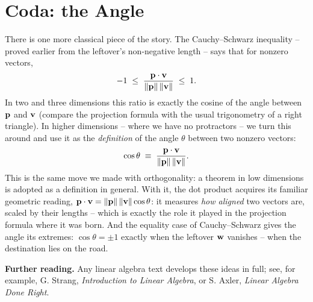 \documentclass[12pt]{article}
\begin{document}
\section{Coda: the Angle}
There is one more classical piece of the story.  The Cauchy--Schwarz
inequality -- proved earlier from the leftover's non-negative length --
says that for nonzero vectors,
$$ -1 \; \le \; \frac{{\bf p} \cdot {\bf v}}{\|{\bf p}\| \, \|{\bf v}\|}
\; \le \; 1. $$
In two and three dimensions this ratio is exactly the cosine of the angle
between ${\bf p}$ and ${\bf v}$ (compare the projection formula with the
usual trigonometry of a right triangle).  In higher dimensions -- where we
have no protractors -- we turn this around and use it as the
{\em definition\/} of the angle $\theta$ between two nonzero vectors:
$$ \cos \theta \; \equiv \;
\frac{{\bf p} \cdot {\bf v}}{\|{\bf p}\| \, \|{\bf v}\|}. $$
This is the same move we made with orthogonality: a theorem in low
dimensions is adopted as a definition in general.  With it, the dot
product acquires its familiar geometric reading,
${\bf p} \cdot {\bf v} = \|{\bf p}\| \, \|{\bf v}\| \cos \theta$: it
measures {\em how aligned\/} two vectors are, scaled by their lengths --
which is exactly the role it played in the projection formula where it
was born. And the equality case of Cauchy--Schwarz gives the angle its
extremes: $\cos\theta = \pm 1$ exactly when the leftover ${\bf w}$
vanishes -- when the destination lies on the road.

{\bf Further reading.} Any linear algebra text develops these ideas in
full; see, for example, G. Strang, {\it Introduction to Linear
Algebra\/}, or S. Axler, {\it Linear Algebra Done Right\/}.
\end{document}
